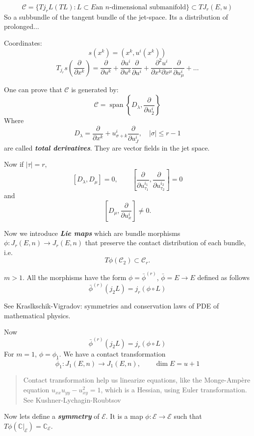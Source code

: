 $$\mathcal{C}=\{Tj_rL(TL):L \subset E \text{
an $n$-dimensional submanifold} \}\subset T
J_r(E,u)$$
So a subbundle of the tangent bundle of the
jet-space. Its a distribution of
prolonged$\ldots$

Coordinates:
$$s(x^k)=(x^k, u^i(x^k))$$
$$T_{j_r}s\left( \frac{\partial }{\partial
x^k} \right) =\frac{\partial }{\partial
u^k}+\frac{\partial u^i}{\partial
u^k}\frac{\partial }{\partial
u^i}+\frac{\partial^2 u^i}{\partial x^k
\partial x^\mu}\frac{\partial }{\partial
u^i_\mu}+\ldots$$

One can prove that $\mathcal{C}$ is generated
by:
$$\mathcal{C}=\operatorname{span}\left\{
D_\lambda ,\frac{\partial }{\partial
u^i_2}\right\}$$
Where
$$D_\lambda=\frac{\partial }{\partial
x^k}+u^i_{\sigma+k}\frac{\partial }{\partial
u^i_J},\quad |\sigma|\leq r-1$$
are called {\it\bf total derivatives}. They
are vector fields in the jet space.

Now if $|\tau|=r$,
$$[D_\lambda,D_\mu]=0,\qquad \left[
\frac{\partial }{\partial
u^{i_1}_{\tau_1}},\frac{\partial }{\partial
u^{i_2}_{\tau_2}} \right] =0$$
and
$$\left[ D_\mu,\frac{\partial }{\partial
u^i_x} \right] \neq 0.$$

\medskip{}
Now we introduce {\it\bf Lie maps} which are
bundle morphisms  $\phi:J_r(E,n) \to
J_r(E,n)$ that preserve the contact
distribution of each bundle, i.e.
$$T\phi(\mathcal{C}_2)\subset
\mathcal{C}_r.$$

\begin{theorem}
\label{theorem-wdvv-lie-backlund}
$m>1$. All the morphisms have the form
$\phi=\bar{\phi}^{(r)}$, $\bar{\phi} =E \to
E$ defined as follows
$$\bar{\phi}^{(r)}(j_2L)=j_r(\phi \circ L)$$
\end{theorem}

See Kraslkschik-Vigradov: symmetries  and
conservation laws of PDE of mathematical
physics.

Now
$$\bar{\phi}^{(r)}(j_2L)=j_r(\phi \circ L)$$
For $m=1$, $\phi=\phi_1$. We have a contact
transformation
$$\bar{\phi}_1:J_1(E,n) \longrightarrow
J_1(E,n),\qquad  \dim E= u+1$$

\begin{quotation}
Contact transformation help us linearize
equations, like the Monge-Ampère equation
$u_{xx}u_{y y}-u^2_{xy}=1$, which is a
Hessian, using Euler transformation. See
Kushner-Lychagin-Roubtsov
\end{quotation}

Now lets define a {\it\bf symmetry} of  $
\mathcal{E}$. It is a map
$\phi:\mathcal{E}\to \mathcal{E}$ such that
$T\phi(\mathbb{C}|_{\mathcal{E}})=\mathbb{C}
_{\mathcal{E}}$.

